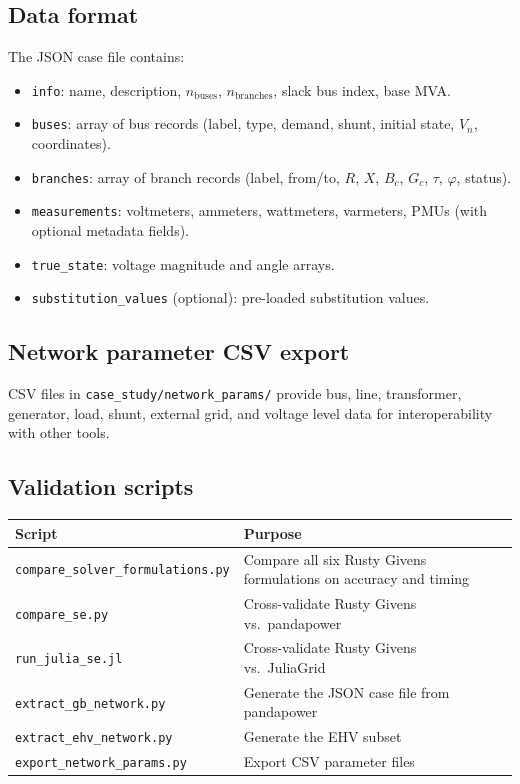 \documentclass[11pt,a4paper]{article}
\begin{document}
\subsection{Data format}

The JSON case file contains:
\begin{itemize}
  \item \texttt{info}: name, description, $n_\text{buses}$, $n_\text{branches}$,
        slack bus index, base MVA.
  \item \texttt{buses}: array of bus records (label, type, demand, shunt,
        initial state, $V_n$, coordinates).
  \item \texttt{branches}: array of branch records (label, from/to,
        $R$, $X$, $B_c$, $G_c$, $\tau$, $\varphi$, status).
  \item \texttt{measurements}: voltmeters, ammeters, wattmeters, varmeters,
        PMUs (with optional metadata fields).
  \item \texttt{true\_state}: voltage magnitude and angle arrays.
  \item \texttt{substitution\_values} (optional): pre-loaded substitution
        values.
\end{itemize}

\subsection{Network parameter CSV export}

CSV files in \texttt{case\_study/network\_params/} provide
bus, line, transformer, generator, load, shunt, external grid, and
voltage level data for interoperability with other tools.

\subsection{Validation scripts}

\begin{center}
\small
\begin{tabular}{lp{55mm}}
  \toprule
  \textbf{Script} & \textbf{Purpose} \\
  \midrule
  \texttt{compare\_solver\_formulations.py}
    & Compare all six Rusty Givens formulations on accuracy and timing \\
  \texttt{compare\_se.py}
    & Cross-validate Rusty Givens vs.\ pandapower~\cite{thurner2018} \\
  \texttt{run\_julia\_se.jl}
    & Cross-validate Rusty Givens vs.\ JuliaGrid~\cite{cosovic2025} \\
  \texttt{extract\_gb\_network.py}
    & Generate the JSON case file from pandapower \\
  \texttt{extract\_ehv\_network.py}
    & Generate the EHV subset \\
  \texttt{export\_network\_params.py}
    & Export CSV parameter files \\
  \bottomrule
\end{tabular}
\end{center}
\end{document}
